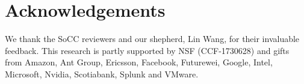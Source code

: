 \section{Acknowledgements}
\label{sec:acknowledgements}

We thank the SoCC reviewers and our shepherd, Lin Wang, for their invaluable feedback.
This research is partly supported by NSF (CCF-1730628) and gifts from Amazon, Ant Group, Ericsson, Facebook, Futurewei, Google, Intel, Microsoft, Nvidia, Scotiabank, Splunk and VMware.
